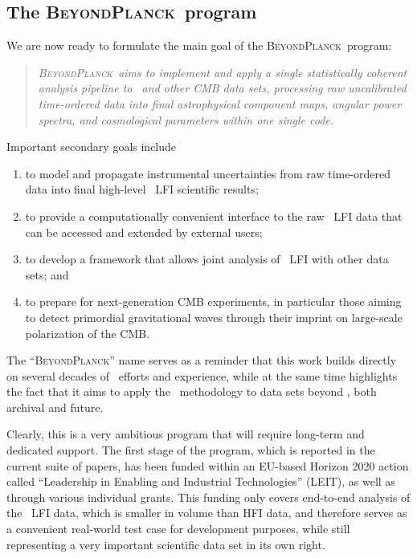 \documentclass[twocolumn]{aa}
\newcommand{\BP}{\textsc{BeyondPlanck}}
\begin{document}
\subsection{The \BP\ program}
\label{sec:bp_program}

We are now ready to formulate the main goal of the
\BP\ program:
\begin{quotation}
  \emph{\BP\ aims to implement and apply a single statistically
    coherent analysis pipeline to \Planck\ and other CMB data sets,
    processing raw uncalibrated time-ordered data into final
    astrophysical component maps, angular power spectra, and
    cosmological parameters within one single code.}
\end{quotation}
Important secondary goals include
\begin{enumerate}
\item to model and propagate instrumental uncertainties from raw
  time-ordered data into final high-level \Planck\ LFI scientific results;
\item to provide a computationally convenient interface to the raw
  \Planck\ LFI data that can be accessed and extended by external users;
\item to develop a framework that allows joint analysis of \Planck\ LFI with
  other data sets; and
\item to prepare for next-generation CMB experiments, in particular
  those aiming to detect primordial gravitational waves through their
  imprint on large-scale polarization of the CMB.
\end{enumerate}
The ``\BP'' name serves as a reminder that this work builds directly
on several decades of \Planck\ efforts and experience, while at the
same time highlights the fact that it aims to apply the
\Planck\ methodology to data sets beyond \Planck, both archival and
future.

Clearly, this is a very ambitious program that will require long-term
and dedicated support. The first stage of the program, which is
reported in the current suite of papers, has been funded within an
EU-based Horizon 2020 action called ``Leadership in Enabling and
Industrial Technologies'' (LEIT), as well as through various
individual grants. This funding only covers end-to-end analysis of the
\Planck\ LFI data, which is smaller in volume than HFI data, and therefore
serves as a convenient real-world test case for development purposes,
while still representing a very important scientific data set in its
own right.
\end{document}
